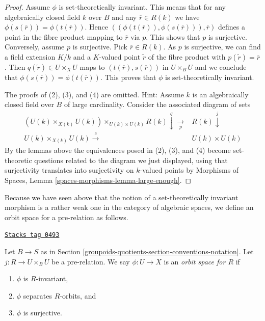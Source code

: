 \begin{proof}
Assume $\phi$ is set-theoretically invariant. This means that for any
algebraically closed field $k$ over $B$ and any $\overline{r} \in R(k)$
we have $\phi(s(\overline{r})) = \phi(t(\overline{r}))$. Hence
$((\phi(t(\overline{r})), \phi(s(\overline{r}))), \overline{r})$
defines a point in the fibre product mapping to $\overline{r}$ via
$p$. This shows that $p$ is surjective. Conversely, assume $p$ is
surjective. Pick $\overline{r} \in R(k)$. As $p$ is surjective, we
can find a field extension $K/k$ and a $K$-valued point
$\tilde r$ of the fibre product with $p(\tilde r) = \overline{r}$.
Then $q(\tilde r) \in U \times_X U$ maps to
$(t(\overline{r}), s(\overline{r}))$ in $U \times_B U$ and we conclude
that $\phi(s(\overline{r})) = \phi(t(\overline{r}))$. This proves
that $\phi$ is set-theoretically invariant.

\medskip\noindent
The proofs of (2), (3), and (4) are omitted. Hint: Assume $k$ is an
algebraically closed field over $B$ of large cardinality. Consider the
associated diagram of sets
$$
\begin{array}{cc}(U(k) \times_{X(k)} U(k)) \times_{U(k) \times U(k)} R(k) \overset{q}{\downarrow}\underset{p}{\longrightarrow} & R(k) \overset{j}{\downarrow} \\ U(k) \times_{X(k)} U(k) \overset{c}{\longrightarrow} & U(k) \times U(k)\end{array}
$$
By the lemmas above the equivalences posed in (2), (3), and (4) become
set-theoretic questions related to the diagram we just displayed, using
that surjectivity translates into surjectivity on $k$-valued points by
Morphisms of Spaces, Lemma \ref{spaces-morphisms-lemma-large-enough}.
\end{proof}

Because we have seen above that the notion of a set-theoretically
invariant morphism is a rather weak one in the category of algebraic
spaces, we define an orbit space for a pre-relation as follows.

\begin{definition}
\label{groupoids-quotients-definition-orbit-space}
\href{https://stacks.math.columbia.edu/tag/0493}{\texttt{Stacks tag 0493}}

Let $B \to S$ as in Section \ref{groupoids-quotients-section-conventions-notation}.
Let $j : R \to U \times_B U$ be a pre-relation.
We say $\phi : U \to X$ is an {\it orbit space for $R$} if
\begin{enumerate}
\item $\phi$ is $R$-invariant,
\item $\phi$ separates $R$-orbits, and
\item $\phi$ is surjective.
\end{enumerate}
\end{definition}

